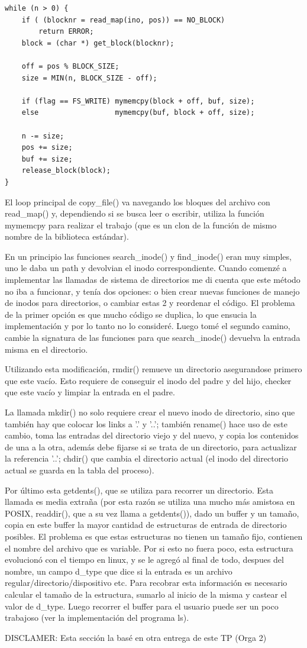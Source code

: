 \begin{verbatim}
while (n > 0) {
    if ( (blocknr = read_map(ino, pos)) == NO_BLOCK)
        return ERROR;
    block = (char *) get_block(blocknr);

    off = pos % BLOCK_SIZE;
    size = MIN(n, BLOCK_SIZE - off);

    if (flag == FS_WRITE) mymemcpy(block + off, buf, size);
    else                  mymemcpy(buf, block + off, size);

    n -= size;
    pos += size;
    buf += size;
    release_block(block);
}
\end{verbatim}

El loop principal de copy\_file() va navegando los bloques del archivo con
read\_map() y, dependiendo si se busca leer o escribir, utiliza la función
mymemcpy para realizar el trabajo (que es un clon de la función de mismo nombre
de la biblioteca estándar).


En un principio las funciones search\_inode() y find\_inode() eran muy simples,
uno le daba un path y devolvian el inodo correspondiente. Cuando comenzé a
implementar las llamadas de sistema de directorios me di cuenta que
este método no iba a funcionar, y tenía dos opciones: o bien crear nuevas
funciones de manejo de inodos para directorios, o cambiar estas 2 y reordenar el
código. El problema de la primer opción es que mucho código se duplica, lo que
ensucia la implementación y por lo tanto no lo consideré. Luego tomé el segundo
camino, cambie la signatura de las funciones para que search\_inode() devuelva
la entrada misma en el directorio.

Utilizando esta modificación, rmdir() remueve un directorio asegurandose
primero que este vacío. Esto requiere de conseguir el inodo del padre y del
hijo, checker que este vacío y limpiar la entrada en el padre.

La llamada mkdir() no solo requiere crear el nuevo inodo de directorio, sino que
también hay que colocar los links a '.' y '..'; también rename() hace uso de
este cambio, toma las entradas del directorio viejo y del nuevo, y copia los
contenidos de una a la otra, además debe fijarse si se trata de un directorio,
para actualizar la referencia '..'; chdir() que cambia el directorio actual
(el inodo del directorio actual se guarda en la tabla del proceso).

Por último esta getdents(), que se utiliza para recorrer un directorio. Esta
llamada es media extraña (por esta razón se utiliza una mucho más amistosa en
POSIX, readdir(), que a su vez llama a getdents()), dado un buffer y un tamaño,
copia en este buffer la mayor cantidad de estructuras de entrada de directorio
posibles. El problema es que estas estructuras no tienen un tamaño fijo,
contienen el nombre del archivo que es variable. Por si esto no fuera poco,
esta estructura evolucionó con el tiempo en linux, y se le agregó al final de
todo, despues del nombre, un campo d\_type que dice si la entrada es un archivo
regular/directorio/dispositivo etc. Para recobrar esta información es necesario
calcular el tamaño de la estructura, sumarlo al inicio de la misma y castear el
valor de d\_type. Luego recorrer el buffer para el usuario puede ser un poco
trabajoso (ver la implementación del programa ls).

DISCLAMER: Esta sección la basé en otra entrega de este TP (Orga 2)
